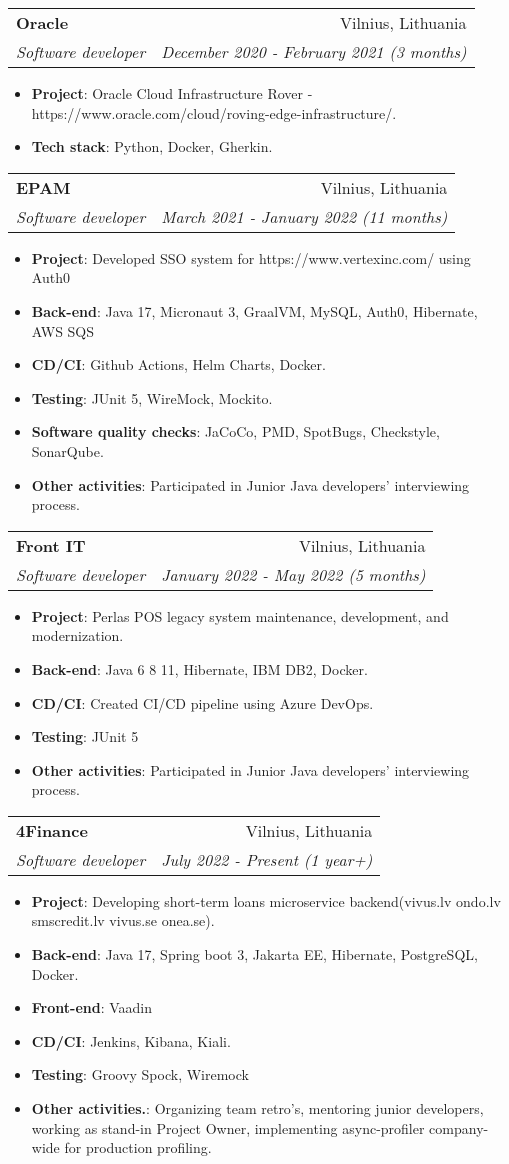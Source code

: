 \documentclass[letterpaper,11pt]{article}
\makeatletter
\newcommand{\resumeItem}[2]{
  \item\small{
    \textbf{#1}{: #2 \vspace{-2pt}}
  }
}
\newcommand{\resumeSubheading}[4]{
  \vspace{-1pt}\item
    \begin{tabular*}{0.97\textwidth}[t]{l@{\extracolsep{\fill}}r}
      \textbf{#1} & #2 \\
      \textit{\small#3} & \textit{\small #4} \\
    \end{tabular*}\vspace{-5pt}
}
\newcommand{\resumeItemListStart}{\begin{itemize}}
\newcommand{\resumeItemListEnd}{\end{itemize}\vspace{-5pt}}
\makeatother
\begin{document}
    \resumeSubheading
      {Oracle}{Vilnius, Lithuania}
      {Software developer}{December 2020 - February 2021 (3 months)}
      \resumeItemListStart
	 \resumeItem{Project}
	          {Oracle Cloud Infrastructure Rover - https://www.oracle.com/cloud/roving-edge-infrastructure/.}
      \resumeItem{Tech stack}
	          {Python, Docker, Gherkin.}
      \resumeItemListEnd
      
       \resumeSubheading
      {EPAM}{Vilnius, Lithuania}
      {Software developer}{March 2021 - January 2022 (11 months)}
      \resumeItemListStart
	  \resumeItem{Project}
	          {Developed SSO system for https://www.vertexinc.com/ using Auth0}
	 \resumeItem{Back-end}
	          {Java 17, Micronaut 3, GraalVM, MySQL, Auth0, Hibernate, AWS SQS}
	 \resumeItem{CD/CI}
	          {Github Actions, Helm Charts, Docker.}
	 \resumeItem{Testing}
	          {JUnit 5, WireMock, Mockito.}
	\resumeItem{Software quality checks}
	          {JaCoCo, PMD, SpotBugs, Checkstyle, SonarQube.}
	\resumeItem{Other activities}
	          {Participated in Junior Java developers' interviewing process.}
      \resumeItemListEnd
      
      \resumeSubheading
      {Front IT}{Vilnius, Lithuania}
      {Software developer}{January 2022 - May 2022 (5 months)}
      \resumeItemListStart
	  \resumeItem{Project}
	          {Perlas POS legacy system maintenance, development, and modernization.}
	 \resumeItem{Back-end}
	          {Java 6 8 11, Hibernate, IBM DB2, Docker.}
	 \resumeItem{CD/CI}
	          {Created CI/CD pipeline using Azure DevOps.}
	 \resumeItem{Testing}
	          {JUnit 5}
	\resumeItem{Other activities}
	          {Participated in Junior Java developers' interviewing process.}
      \resumeItemListEnd
\pagebreak
      \resumeSubheading
      {4Finance}{Vilnius, Lithuania}
      {Software developer}{July 2022 - Present (1 year+)}
      \resumeItemListStart
	  \resumeItem{Project}
	          {Developing short-term loans microservice backend(vivus.lv ondo.lv smscredit.lv vivus.se onea.se).}
	 \resumeItem{Back-end}
	          {Java 17, Spring boot 3, Jakarta EE, Hibernate, PostgreSQL, Docker.}
	 \resumeItem{Front-end}
	          {Vaadin}
	 \resumeItem{CD/CI}
	          {Jenkins, Kibana, Kiali.}
	 \resumeItem{Testing}
	          {Groovy Spock, Wiremock}
	\resumeItem{Other activities.}
	          {Organizing team retro's, mentoring junior developers, working as stand-in Project Owner, implementing async-profiler company-wide for production profiling.}
      \resumeItemListEnd
      
\end{document}
